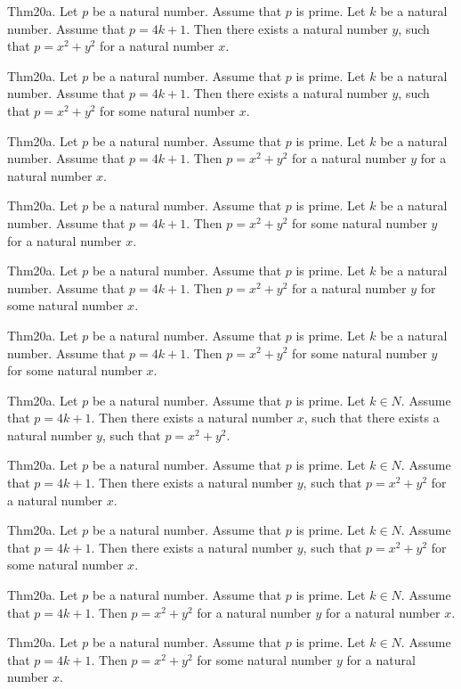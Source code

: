 \documentclass{article}
\begin{document}
Thm20a. Let $p$ be a natural number. Assume that $p$ is prime. Let $k$ be a natural number. Assume that $p = 4 k + 1$. Then there exists a natural number $y$, such that $p = x ^{ 2}+ y ^{ 2}$ for a natural number $x$.

Thm20a. Let $p$ be a natural number. Assume that $p$ is prime. Let $k$ be a natural number. Assume that $p = 4 k + 1$. Then there exists a natural number $y$, such that $p = x ^{ 2}+ y ^{ 2}$ for some natural number $x$.

Thm20a. Let $p$ be a natural number. Assume that $p$ is prime. Let $k$ be a natural number. Assume that $p = 4 k + 1$. Then $p = x ^{ 2}+ y ^{ 2}$ for a natural number $y$ for a natural number $x$.

Thm20a. Let $p$ be a natural number. Assume that $p$ is prime. Let $k$ be a natural number. Assume that $p = 4 k + 1$. Then $p = x ^{ 2}+ y ^{ 2}$ for some natural number $y$ for a natural number $x$.

Thm20a. Let $p$ be a natural number. Assume that $p$ is prime. Let $k$ be a natural number. Assume that $p = 4 k + 1$. Then $p = x ^{ 2}+ y ^{ 2}$ for a natural number $y$ for some natural number $x$.

Thm20a. Let $p$ be a natural number. Assume that $p$ is prime. Let $k$ be a natural number. Assume that $p = 4 k + 1$. Then $p = x ^{ 2}+ y ^{ 2}$ for some natural number $y$ for some natural number $x$.

Thm20a. Let $p$ be a natural number. Assume that $p$ is prime. Let $k \in N$. Assume that $p = 4 k + 1$. Then there exists a natural number $x$, such that there exists a natural number $y$, such that $p = x ^{ 2}+ y ^{ 2}$.

Thm20a. Let $p$ be a natural number. Assume that $p$ is prime. Let $k \in N$. Assume that $p = 4 k + 1$. Then there exists a natural number $y$, such that $p = x ^{ 2}+ y ^{ 2}$ for a natural number $x$.

Thm20a. Let $p$ be a natural number. Assume that $p$ is prime. Let $k \in N$. Assume that $p = 4 k + 1$. Then there exists a natural number $y$, such that $p = x ^{ 2}+ y ^{ 2}$ for some natural number $x$.

Thm20a. Let $p$ be a natural number. Assume that $p$ is prime. Let $k \in N$. Assume that $p = 4 k + 1$. Then $p = x ^{ 2}+ y ^{ 2}$ for a natural number $y$ for a natural number $x$.

Thm20a. Let $p$ be a natural number. Assume that $p$ is prime. Let $k \in N$. Assume that $p = 4 k + 1$. Then $p = x ^{ 2}+ y ^{ 2}$ for some natural number $y$ for a natural number $x$.
\end{document}
